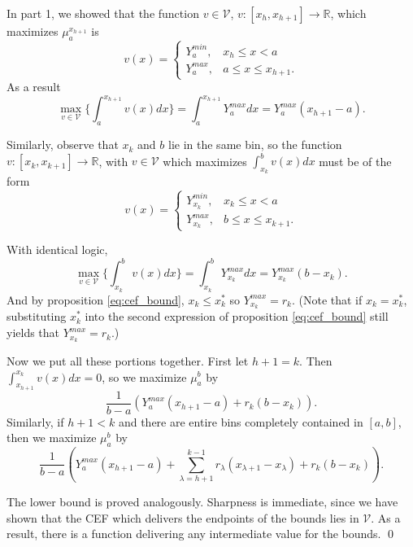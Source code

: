 In part 1, we showed that the function $v \in \mathcal{V}$, 
$v:[x_h,x_{h+1}] \to \mathbb{R}$, which maximizes $\mu_a^{x_{h+1}}
$ is
$$ v(x) = \begin{cases}
Y_a^{min}, & x_{h} \leq x < a \\
Y_a^{max}, & a \leq x \leq x_{h+1}. 
\end{cases}
$$ 
As a result $$\underset{v \in \mathcal{V}}{\max}\Bigg\{ \int_a^{x_{h+1}} v(x) dx \Bigg\} = \int_a^{x_{h+1}} Y_a^{max} dx = Y_a^{max} (x_{h+1} -a).$$

Similarly, observe that $x_k$ and $b$ lie in the same bin, so the function
$v:[x_k,x_{k+1}] \to \mathbb{R}$, with $v \in \mathcal{V}$  which maximizes $\int_{x_k}^b v(x)dx$ must be of the form 
$$ v(x) = \begin{cases}
Y_{x_k}^{min}, & x_{k} \leq x < a \\
Y_{x_k}^{max}, & b \leq x \leq x_{k+1}. 
\end{cases}
$$ 

With identical logic, 
$$\underset{v \in \mathcal{V}}{\max}\Bigg\{ \int_{x_k}^{b} v(x) dx \Bigg\}
= \int_{x_k}^{b} Y_{x_k}^{max} dx = Y_{x_k}^{max} (b -x_k).$$
And by proposition \ref{eq:cef_bound}, $x_k \leq x_k^*$ so $Y_{x_k}^{max} =
r_{k}$. (Note that if $x_k = x_k^*$, substituting $x_k^*$ into the second
expression of proposition \ref{eq:cef_bound} still yields that
$Y_{x_k}^{max} = r_k$.) 

Now we put all these portions together. First let $h + 1 = k$. Then
$\int_{x_{h+1}}^{x_k} v(x) dx = 0$, so 
we maximize $\mu_a^b$ by
$$\frac{1}{b-a} \left( Y_a^{max} (x_{h+1} -a) + r_k (b
-x_k) \right). $$ Similarly, if $h +1 < k$ and there are entire bins completely
contained in $[a,b]$, then we maximize $\mu_a^b$ by 
$$\frac{1}{b-a} \left( Y_a^{max} (x_{h+1} -a) + \sum_{\lambda =
  h+1}^{k-1} r_{\lambda}
    (x_{\lambda+1} - x_{\lambda}) + r_k  (b -x_k) 
\right). $$ 

The lower bound is proved analogously. Sharpness is immediate, since
we have shown that the CEF which delivers the endpoints of the
bounds lies in $\mathcal{V}$. As a result, there is a function delivering any intermediate
value for the bounds. \qed 

\vspace{1em}
